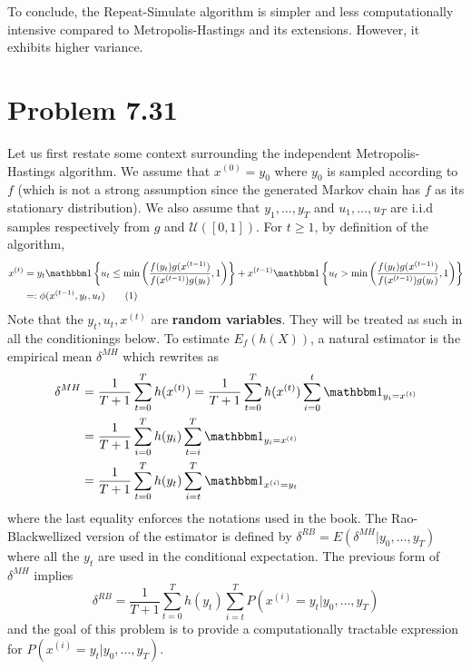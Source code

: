 \documentclass[a4paper,11pt, hidelinks]{article}
\begin{document}
\begin{figure}[H]
\begin{tabular}{|c||c|c|c|}
\end{tabular}
\end{figure}

\noindent To conclude, the Repeat-Simulate algorithm is simpler and less computationally intensive compared to Metropolis-Hastings and its extensions. However, it exhibits higher variance.


\section*{Problem 7.31}

Let us first restate some context surrounding the independent Metropolis-Hastings algorithm. We assume that $x^{(0)}=y_0$ where $y_0$ is sampled according to $f$ (which is not a strong assumption since the generated Markov chain has $f$ as its stationary distribution). We also assume that $y_1,\ldots,y_T$ and $u_1,\ldots,u_T$ are i.i.d samples respectively from $g$ and $\mathcal U([0,1])$. For $t\geq 1$, by definition of the algorithm,  \begin{align*}x^{(t)} &= y_t \mathbbm 1\left\{u_t \leq \min \left(\frac{f(y_t)g(x^{(t-1)})}{f(x^{(t-1)})g(y_t)},1 \right)\right\} + x^{(t-1)} \mathbbm 1\left\{u_t > \min \left(\frac{f(y_t)g(x^{(t-1)})}{f(x^{(t-1)})g(y_t)}, 1 \right)\right\}\\
&=: \phi(x^{(t-1)}, y_t, u_t) \tag{1}\label{eq:1}
\end{align*}
Note that the $y_t, u_t, x^{(t)}$ are \textbf{random variables}. They will be treated as such in all the conditionings below. To estimate $E_f(h(X))$, a natural estimator is the empirical mean $\delta^{MH}$ which rewrites as $$\begin{aligned}
    \delta^{MH} &= \frac 1{T+1} \sum_{t=0}^T h(x^{(t)})  = \frac 1{T+1} \sum_{t=0}^T h(x^{(t)}) \sum_{i=0}^t \mathbbm 1_{y_i =x^{(t)}} \\
    &= \frac 1{T+1} \sum_{i=0}^{T}h(y_i)\sum_{t=i}^T  \mathbbm 1_{y_i =x^{(t)}}\\
    &= \frac 1{T+1} \sum_{t=0}^{T}h(y_t)\sum_{i=t}^T  \mathbbm 1_{x^{(i)} =y_t}
\end{aligned}$$
where the last equality enforces the notations used in the book.\newline
The Rao-Blackwellized version of the estimator is defined by $\delta^{RB} = E(\delta^{MH}|y_0,\ldots,y_T)$ where all the $y_t$ are used in the conditional expectation. The previous form of $\delta^{MH}$ implies $$\delta^{RB} = \frac 1{T+1} \sum_{t=0}^{T}h(y_t)\sum_{i=t}^T  P(x^{(i)} =y_t|y_0,\ldots,y_T)$$ and the goal of this problem is to provide a computationally tractable expression for $P(x^{(i)} =y_t|y_0,\ldots,y_T)$.
\end{document}
